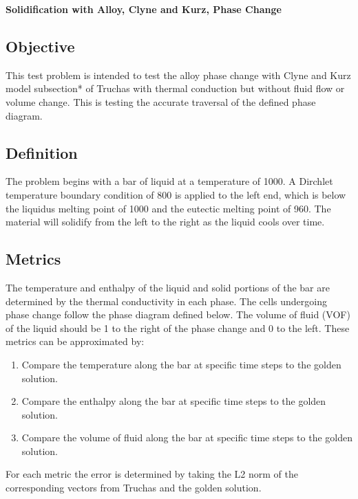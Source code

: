 \documentclass[12pt]{article}
\begin{document}
\begin{center}
{\large {\bf Solidification with Alloy, Clyne and Kurz, Phase Change}}
\end{center}


\subsection*{Objective}

This test problem is intended to test the alloy phase change with Clyne and Kurz model subsection* of Truchas with thermal conduction but without fluid flow or volume change.  This is testing the accurate traversal of the defined phase diagram.

\subsection*{Definition}

The problem begins with a bar of liquid at a temperature of 1000.  A Dirchlet temperature boundary condition of 800 is applied to the left end, which is below the liquidus melting point of 1000 and the eutectic melting point of 960.  The material will solidify from the left to the right as the liquid cools over time.

\subsection*{Metrics}

The temperature and enthalpy of the liquid and solid portions of the bar are determined by the thermal conductivity in each phase.  The cells undergoing phase change follow the phase diagram defined below.  The volume of fluid (VOF) of the liquid should be 1 to the right of the phase change and 0 to the left.  These metrics can be approximated by:

\begin{enumerate}
\item Compare the temperature along the bar at specific time steps to the golden solution.
\item Compare the enthalpy along the bar at specific time steps to the golden solution.
\item Compare the volume of fluid along the bar at specific time steps to the golden solution.
\end{enumerate}

For each metric the error is determined by taking the L2 norm of the corresponding vectors from Truchas and the golden solution.
\end{document}

